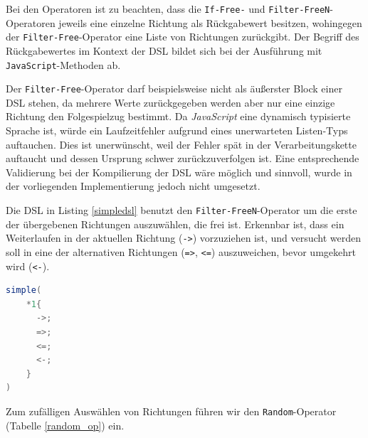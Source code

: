 \documentclass[conference]{IEEEtran}
\begin{document}
Bei den Operatoren ist zu beachten, dass die \texttt{If-Free-} und \texttt{Filter-FreeN}-Operatoren jeweils eine einzelne Richtung als Rückgabewert besitzen, wohingegen der \texttt{Filter-Free}-Operator eine Liste von Richtungen zurückgibt. Der Begriff des Rückgabewertes im Kontext der DSL bildet sich bei der Ausführung mit \texttt{JavaScript}-Methoden ab.


Der \texttt{Filter-Free}-Operator darf beispielsweise nicht als äußerster Block einer DSL stehen, da mehrere Werte zurückgegeben werden aber nur eine einzige Richtung den Folgespielzug bestimmt. Da \emph{JavaScript} eine dynamisch typisierte Sprache ist, würde ein Laufzeitfehler aufgrund eines unerwarteten Listen-Typs auftauchen. Dies ist unerwünscht, weil der Fehler spät in der Verarbeitungskette auftaucht und dessen Ursprung schwer zurückzuverfolgen ist. Eine entsprechende Validierung bei der Kompilierung der DSL wäre möglich und sinnvoll, wurde in der vorliegenden Implementierung jedoch nicht umgesetzt.

Die DSL in Listing \ref{simpledsl} benutzt den \texttt{Filter-FreeN}-Operator um die erste der übergebenen Richtungen auszuwählen, die frei ist. Erkennbar ist, dass ein Weiterlaufen in der aktuellen Richtung (\texttt{->}) vorzuziehen ist, und versucht werden soll in eine der alternativen Richtungen (\texttt{=>}, \texttt{<=}) auszuweichen, bevor umgekehrt wird (\texttt{<-}).


\begin{lstlisting}[language=Java, captionpos=b, caption=AI DSL mit \texttt{Filter-FreeN}-Operator, label=simpledsl]
simple(
    *1{
      ->;
      =>;
      <=;
      <-;
    }
)
\end{lstlisting}

Zum zufälligen Auswählen von Richtungen führen wir den \texttt{Random}-Operator (Tabelle \ref{random_op}) ein.
\end{document}
